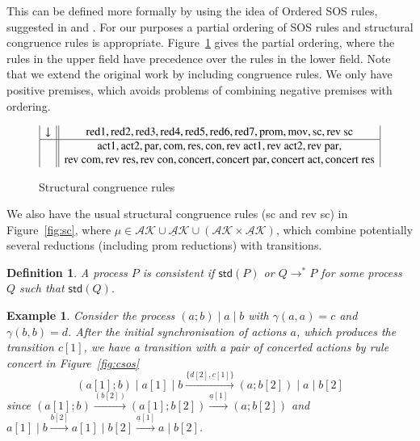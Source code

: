 \documentclass[preprint,12pt]{elsarticle}
\newcommand{\paral}{\; \vert \;}
\newcommand{\mAK}{\mathcal{AK}}
\newcommand{\umAK}{\underline{\mathcal{A}}\mathcal{K}}
\newcommand{\rom}[1]{\mbox{\rm{#1}}}
\newcommand{\std}[1]{\mathsf{std}(#1)}
\newtheorem{definition}{Definition}
\newtheorem{example}{Example}
\begin{document}
This can be defined more formally by using the idea of Ordered SOS rules, suggested in \cite{irek2002} and \cite{mousavi}. For our purposes a partial ordering of SOS rules and structural congruence rules is appropriate. Figure~\ref{fig:osos} gives the partial ordering, where the rules in the upper field have precedence over the rules in the lower field. Note that we extend the original work by including congruence rules. We only have positive premises, which avoids problems of combining negative premises with ordering.

\begin{figure}
\[
\begin{array}{|c||c|}
\downarrow & \rom{red1}, \rom{red2}, \rom{red3}, \rom{red4}, \rom{red5}, \rom{red6}, \rom{red7}, \rom{prom}, \rom{mov}, \rom{sc}, \rom{rev sc} \\
\hline
& \rom{act1}, \rom{act2}, \rom{par}, \rom{com}, \rom{res}, \rom{con}, \rom{rev act1}, \rom{rev act2}, \rom{rev par}, \\
& \rom{rev com}, \rom{rev res}, \rom{rev con}, \rom{concert}, \rom{concert par}, \rom{concert act}, \rom{concert res} 
\end{array}
\] 
\caption{Structural congruence rules} \label{fig:osos}
\end{figure}

We also have the usual structural congruence rules 
(sc and rev sc) in Figure~\ref{fig:sc}, where $\mu \in \mAK\cup \umAK \cup (\mAK\times \umAK) $, 
which combine potentially several reductions (including prom reductions) with transitions.

\begin{definition} \normalfont A process $P$ is \emph{consistent} if $\std{P}$ or $Q \rightarrow^* P$ 
for some process $Q$ such that $\std{Q}$.
\end{definition}

\begin{example}\label{ex:examp1}
Consider the process $(a;b) \paral a \paral b$ with $\gamma(a,a)=c$ and $\gamma(b,b)=d$. After the
initial synchronisation of actions $a$, which produces the transition $c[1]$, we have a transition 
with a pair of concerted actions by rule concert in Figure~\ref{fig:csos}
$$(a[1];b) \paral a[1] \paral  b \xrightarrow{\{d[2], \underline{c}[1]\}} 
  (a;b[2])\paral a \paral b[2]$$
since $(a[1];b) \xrightarrow{(b[2])} (a[1];b[2])\xrightarrow{\underline{a}[1]} (a;b[2])$ 
and $a[1] \paral b \xrightarrow{b[2]} a[1] \paral b[2] \xrightarrow{\underline{a}[1]} a \paral b[2]$.
\end{example}
\end{document}
